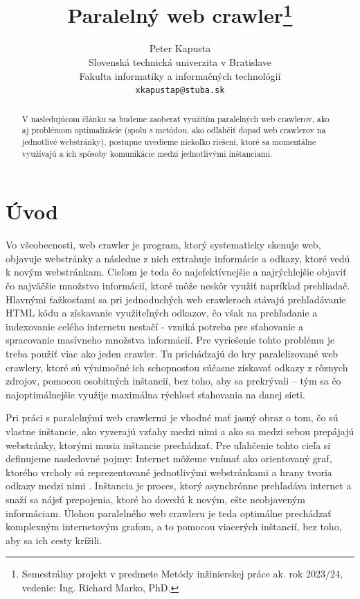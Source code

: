 \documentclass[10pt,twoside,slovak,a4paper]{article}
\title{Paralelný web crawler\thanks{Semestrálny projekt v predmete Metódy inžinierskej práce ak. rok 2023/24, vedenie: Ing. Richard Marko, PhD.}}
\author{Peter Kapusta \\
    \small Slovenská technická univerzita v Bratislave \\
    \small Fakulta informatiky a informačných technológií \\
    \small \texttt{xkapustap@stuba.sk}
}
\begin{document}
\maketitle

\begin{abstract}
    V nasledujúcom článku sa budeme zaoberať využitím paralelných web crawlerov, ako aj problémom optimalizácie (spolu s metódou, ako odľahčiť dopad web crawlerov na jednotlivé webstránky), postupne uvedieme niekoľko riešení, ktoré sa momentálne využívajú a ich spôsoby komunikácie medzi jednotlivými inštanciami.
\end{abstract}

\section{Úvod}

Vo všeobecnosti, web crawler je program, ktorý systematicky skenuje web, objavuje webstránky a následne z nich extrahuje informácie a odkazy, ktoré vedú k novým webstránkam. Cieľom je teda čo najefektívnejšie a najrýchlejšie objaviť čo najväčšie množstvo informácií, ktoré môže neskôr využiť napríklad prehliadač. Hlavnými ťažkosťami sa pri jednoduchých web crawleroch stávajú prehľadávanie HTML kódu a získavanie využiteľných odkazov, čo však na prehľadanie a indexovanie celého internetu nestačí - vzniká potreba pre sťahovanie a spracovanie masívneho množstva informácií. Pre vyriešenie tohto problému je treba použiť viac ako jeden crawler. Tu prichádzajú do hry paralelizované web crawlery, ktoré sú výnimočné ich schopnosťou súčasne získavať odkazy z rôznych zdrojov, pomocou osobitných inštancií, bez toho, aby sa prekrývali – tým sa čo najoptimálnejšie využije maximálna rýchlosť sťahovania na danej sieti.

Pri práci s paralelnými web crawlermi je vhodné mať jasný obraz o tom, čo sú vlastne inštancie, ako vyzerajú vzťahy medzi nimi a ako sa medzi sebou prepájajú webstránky, ktorými musia inštancie prechádzať. Pre uľahčenie tohto cieľa si definujeme nasledovné pojmy: Internet môžeme vnímať ako orientovaný graf, ktorého vrcholy sú reprezentované jednotlivými webstránkami a hrany tvoria odkazy medzi nimi \cite{7148493}. Inštancia je proces, ktorý asynchrónne prehľadáva internet a snaží sa nájsť prepojenia, ktoré ho dovedú k novým, ešte neobjaveným informáciam. Úlohou paralelného web crawleru je teda optimálne prechádzať komplexným internetovým grafom, a to pomocou viacerých inštancií, bez toho, aby sa ich cesty krížili.
\end{document}
